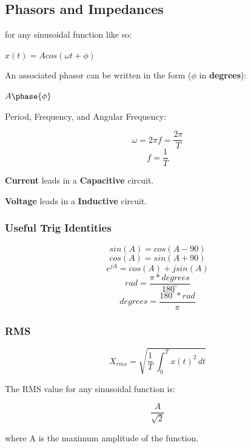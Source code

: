 \documentclass{article}
\begin{document}
\subsection*{Phasors and Impedances}
\begin{center}
    for any sinusoidal function like so:
    
    $x(t) = Acos(\omega t + \phi)$
    
    An associated phasor can be written in the form ($\phi$ in \textbf{degrees}):
    
    $A \phase {\phi}$
\end{center}
\begin{center}
      Period, Frequency, and Angular Frequency:
\end{center}
\begin{equation}
    \omega = 2\pi f = \frac{2\pi}{T}
\end{equation}
\begin{equation}
    f = \frac{1}{T}
\end{equation}
\begin{center}
    \textbf{Current} leads in a \textbf{Capacitive} circuit.
    
    \textbf{Voltage} leads in a \textbf{Inductive} circuit.
\end{center}

\subsubsection*{Useful Trig Identities}
\begin{equation}
    sin(A) = cos(A - 90)
\end{equation}
\begin{equation}
    cos(A) = sin(A + 90)
\end{equation}
\begin{equation}
    e^{jA} = cos(A) + jsin(A)
\end{equation}
\begin{equation}
    rad = \frac{\pi*degrees}{180^\circ}
\end{equation}
\begin{equation}
    degrees = \frac{180^\circ * rad}{\pi}
\end{equation}
\subsubsection*{RMS}
\begin{equation}
      X_{rms} = \sqrt{\frac{1}{T}\ \int_{0}^{T} x(t)^2 \,dt }
\end{equation}
\begin{center}
    The RMS value for any sinusoidal function is:
\end{center}    
\begin{equation}
      \frac{A}{\sqrt{2}}
\end{equation}
\begin{center}    
    where A is the maximum amplitude of the function.
\end{center}
\end{document}
